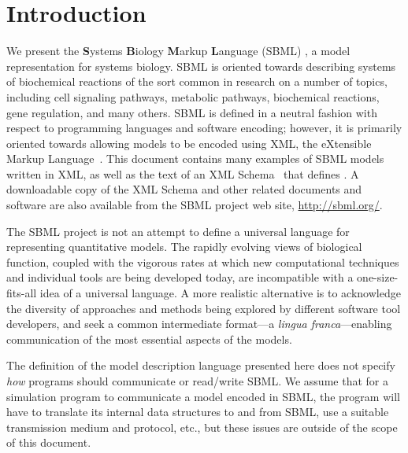 
\section{Introduction}
\label{sec:introduction}

We present the \textbf{S}ystems \textbf{B}iology \textbf{M}arkup
\textbf{L}anguage (SBML) \changed{\thisLVR}, a model
representation  for systems biology.  SBML is oriented
towards describing systems of biochemical reactions of the sort
common in research on a number of topics, including cell signaling
pathways, metabolic pathways, biochemical reactions, gene
regulation, and many others.  SBML is defined in a neutral fashion
with respect to programming languages and software encoding;
however, it is primarily oriented towards allowing models to be
encoded using XML, the eXtensible Markup
Language~\citep{bosak:1999,bray:2000}.  This document contains
many examples of SBML models written in XML, as well as the text
of an XML Schema~\citep{biron:2000,fallside:2000,thompson:2000}
that defines .  A
downloadable copy of the XML Schema and other related documents
and software are also available from the SBML project web site,
\url{http://sbml.org/}.

The SBML project is not an attempt to define a universal language
for representing quantitative models.  The rapidly evolving views
of biological function, coupled with the vigorous rates at which
new computational techniques and individual tools are being
developed today, are incompatible with a one-size-fits-all idea of
a universal language. A more realistic alternative is to
acknowledge the diversity of approaches and methods being explored
by different software tool developers, and seek a common
intermediate format---a \emph{lingua franca}---enabling
communication of the most essential aspects of the models.

The definition of the model description language presented here
does not specify \emph{how} programs should communicate or
read/write SBML.  We assume that for a simulation program to
communicate a model encoded in SBML, the program will have to
translate its internal data structures to and from SBML, use a
suitable transmission medium and protocol, etc., but these issues
are outside of the scope of this document.

